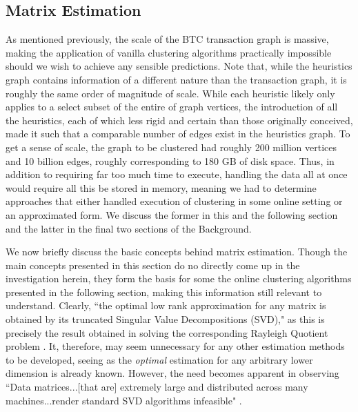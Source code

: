 \documentclass{article}
\begin{document}
\subsection{Matrix Estimation}
As mentioned previously, the scale of the BTC transaction graph is massive, making the application of vanilla clustering algorithms practically impossible should we wish to achieve any sensible predictions. Note that, while the heuristics graph contains information of a different nature than the transaction graph, it is roughly the same order of magnitude of scale. While each heuristic likely only applies to a select subset of the entire of graph vertices, the introduction of all the heuristics, each of which less rigid and certain than those originally conceived, made it such that a comparable number of edges exist in the heuristics graph. To get a sense of scale, the graph to be clustered had roughly 200 million vertices and 10 billion edges, roughly corresponding to 180 GB of disk space. Thus, in addition to requiring far too much time to execute, handling the data all at once would require all this be stored in memory, meaning we had to determine approaches that either handled execution of clustering in some online setting or an approximated form. We discuss the former in this and the following section and the latter in the final two sections of the Background.

We now briefly discuss the basic concepts behind matrix estimation. Though the main concepts presented in this section do no directly come up in the investigation herein, they form the basis for some the online clustering algorithms presented in the following section, making this information still relevant to understand. Clearly, ``the optimal low rank approximation for any matrix is obtained by its truncated Singular Value Decompositions (SVD)," as this is precisely the result obtained in solving the corresponding Rayleigh Quotient problem \cite{sketch}. It, therefore, may seem unnecessary for any other estimation methods to be developed, seeing as the \textit{optimal} estimation for any arbitrary lower dimension is already known. However, the need becomes apparent in observing ``Data matrices...[that are] extremely large and distributed across many machines...render standard SVD algorithms infeasible" \cite{sketch}.
\end{document}
